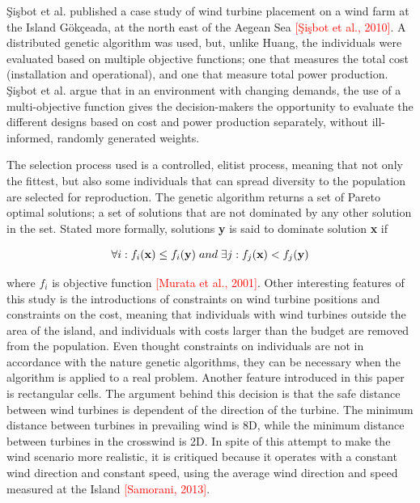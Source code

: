 \noindent \c{S}i\c{s}bot et al. published a case study of wind turbine placement on a wind farm at the Island G{\"o}k\c{c}eada, at the north east of the Aegean Sea \textcolor{red}{[\c{S}i\c{s}bot et al., 2010]}. A distributed genetic algorithm was used, but, unlike Huang, the individuals were evaluated based on multiple objective functions; one that measures the total cost (installation and operational), and one that measure total power production. \c{S}i\c{s}bot et al. argue that in an environment with changing demands, the use of a multi-objective function gives the decision-makers the opportunity to evaluate the different designs based on cost and power production separately, without ill-informed, randomly generated weights.

The selection process used is a controlled, elitist process, meaning that not only the fittest, but also some individuals that can spread diversity to the population are selected for reproduction. The genetic algorithm returns a set of Pareto optimal solutions; a set of solutions that are not dominated by any other solution in the set. Stated more formally, solutions \textbf{y} is said to dominate solution \textbf{x} if

\begin{equation}
\forall i: f_i(\textbf{x}) \leq f_i(\textbf{y}) \hspace{1mm} and \hspace{1mm} \exists j: f_j(\textbf{x}) < f_j(\textbf{y}) 
\label{Dominated solutions}
\end{equation}

where $f_i$ is objective function \textcolor{red}{[Murata et al., 2001]}. Other interesting features of this study is the introductions of constraints on wind turbine positions and constraints on the cost, meaning that individuals with wind turbines outside the area of the island, and individuals with costs larger than the budget are removed from the population. Even thought constraints on individuals are not in accordance with the nature genetic algorithms, they can be necessary when the algorithm is applied to a real problem. Another feature introduced in this paper is rectangular cells. The argument behind this decision is that the safe distance between wind turbines is dependent of the direction of the turbine. The minimum distance between turbines in prevailing wind is 8D, while the minimum distance between turbines in the crosswind is 2D. In spite of this attempt to make the wind scenario more realistic, it is critiqued because it operates with a constant wind direction and constant speed, using the average wind direction and speed measured at the Island \textcolor{red}{[Samorani, 2013]}. \\
